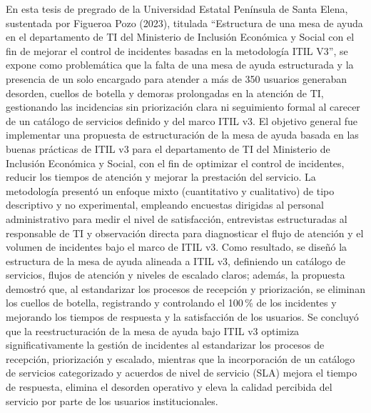 En esta tesis de pregrado de la Universidad Estatal Península de Santa Elena, sustentada por Figueroa Pozo (2023), titulada ``Estructura de una mesa de ayuda en el departamento de TI del Ministerio de Inclusión Económica y Social con el fin de mejorar el control de incidentes basadas en la metodología ITIL V3'', se expone como problemática que la falta de una mesa de ayuda estructurada y la presencia de un solo encargado para atender a más de 350 usuarios generaban desorden, cuellos de botella y demoras prolongadas en la atención de TI, gestionando las incidencias sin priorización clara ni seguimiento formal al carecer de un catálogo de servicios definido y del marco ITIL v3. El objetivo general fue implementar una propuesta de estructuración de la mesa de ayuda basada en las buenas prácticas de ITIL v3 para el departamento de TI del Ministerio de Inclusión Económica y Social, con el fin de optimizar el control de incidentes, reducir los tiempos de atención y mejorar la prestación del servicio. La metodología presentó un enfoque mixto (cuantitativo y cualitativo) de tipo descriptivo y no experimental, empleando encuestas dirigidas al personal administrativo para medir el nivel de satisfacción, entrevistas estructuradas al responsable de TI y observación directa para diagnosticar el flujo de atención y el volumen de incidentes bajo el marco de ITIL v3. Como resultado, se diseñó la estructura de la mesa de ayuda alineada a ITIL v3, definiendo un catálogo de servicios, flujos de atención y niveles de escalado claros; además, la propuesta demostró que, al estandarizar los procesos de recepción y priorización, se eliminan los cuellos de botella, registrando y controlando el 100\,\% de los incidentes y mejorando los tiempos de respuesta y la satisfacción de los usuarios. Se concluyó que la reestructuración de la mesa de ayuda bajo ITIL v3 optimiza significativamente la gestión de incidentes al estandarizar los procesos de recepción, priorización y escalado, mientras que la incorporación de un catálogo de servicios categorizado y acuerdos de nivel de servicio (SLA) mejora el tiempo de respuesta, elimina el desorden operativo y eleva la calidad percibida del servicio por parte de los usuarios institucionales.

\vspace{0.8em}

